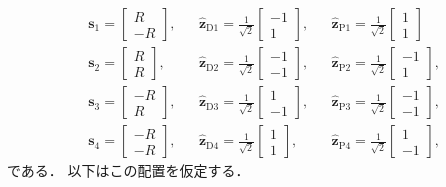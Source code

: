 ﻿\documentclass[a4paper]{jsarticle}
\begin{document}
\begin{align*}
& \bm{s}_{1}=\begin{bmatrix} R \\ -R \end{bmatrix}, &
& \hat{\bm{z}}_{\mathrm{D}1}=\frac{1}{\sqrt{2}}\begin{bmatrix}-1 \\ 1 \end{bmatrix}, &
& \hat{\bm{z}}_{\mathrm{P}1}=\frac{1}{\sqrt{2}}\begin{bmatrix} 1 \\ 1 \end{bmatrix}
\\
& \bm{s}_{2}=\begin{bmatrix} R \\ R \end{bmatrix}, &
& \hat{\bm{z}}_{\mathrm{D}2}=\frac{1}{\sqrt{2}}\begin{bmatrix}-1 \\ -1 \end{bmatrix}, &
& \hat{\bm{z}}_{\mathrm{P}2}=\frac{1}{\sqrt{2}}\begin{bmatrix}-1 \\ 1 \end{bmatrix},
\\
& \bm{s}_{3}=\begin{bmatrix}-R \\ R \end{bmatrix}, &
& \hat{\bm{z}}_{\mathrm{D}3}=\frac{1}{\sqrt{2}}\begin{bmatrix} 1 \\ -1 \end{bmatrix}, &
& \hat{\bm{z}}_{\mathrm{P}3}=\frac{1}{\sqrt{2}}\begin{bmatrix}-1 \\ -1 \end{bmatrix},
\\
& \bm{s}_{4}=\begin{bmatrix}-R \\ -R \end{bmatrix}, &
& \hat{\bm{z}}_{\mathrm{D}4}=\frac{1}{\sqrt{2}}\begin{bmatrix} 1 \\ 1 \end{bmatrix}, &
& \hat{\bm{z}}_{\mathrm{P}4}=\frac{1}{\sqrt{2}}\begin{bmatrix} 1 \\ -1 \end{bmatrix},
\end{align*}
である．
以下はこの配置を仮定する．
\end{document}
